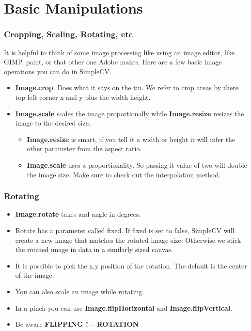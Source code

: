 \documentclass{beamer}
\begin{document}
\section{Basic Manipulations}
\begin{frame}
\frametitle{Cropping, Scaling, Rotating, etc}
It is helpful to think of some image processing like using an image
editor, like GIMP, paint, or that other one Adobe makes. Here are a
few basic image operations you can do in SimpleCV. 
\begin{itemize}
\item \textbf{Image.crop}. Does what it says on the tin. We refer to
  crop areas by there top left corner x and y plus the width height.
\item \textbf{Image.scale} scales the image proportionally while
  \textbf{Image.resize} resizes the image to the desired size. 
  \begin{itemize}
    \item \textbf{Image.resize} is smart, if you tell it a width or
      height it will infer the other parameter from the aspect ratio.
    \item \textbf{Image.scale} uses a proportionality. So passing it
      value of two will double the image size. Make sure to check out
      the interpolation method.
  \end{itemize}
\end{itemize}
\end{frame}
\begin{frame}
\frametitle{Rotating}
\begin{itemize}
  \item \textbf{Image.rotate} takes and angle in degrees.
  \item Rotate has a parameter called fixed. If fixed
        is set to false, SimpleCV will create a new image that matches
        the rotated image size. Otherwise we stick the rotated image
        in data in a similarly sized canvas. 
  \item It is possible to pick the x,y position of the rotation. The
    default is the center of the image.
  \item You can also scale an image while rotating.
  \item In a pinch you can use \textbf{Image.flipHorizontal} and
    \textbf{Image.flipVertical}.
   \item Be aware \textbf{FLIPPING != ROTATION}
\end{itemize}
\end{frame}
\end{document}
